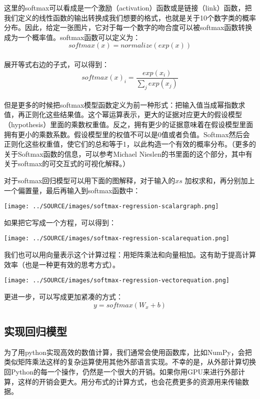 这里的softmax可以看成是一个激励（activation）函数或是链接（link）函数，把我们定义的线性函数的输出转换成我们想要的格式，也就是关于10个数字类的概率分布。因此，给定一张图片，它对于每一个数字的吻合度可以被softmax函数转换成为一个概率值。softmax函数可以定义为：\\
\begin{equation}
softmax(x) = normalize(exp(x))
\end{equation}\\
展开等式右边的子式，可以得到：\\
\begin{equation}
softmax(x)_i = \frac{exp(x_i)}{\sum_j{exp(x_j)}}
\end{equation}\\
但是更多的时候把softmax模型函数定义为前一种形式：把输入值当成幂指数求值，再正则化这些结果值。这个幂运算表示，更大的证据对应更大的假设模型（hypothesis）里面的乘数权重值。反之，拥有更少的证据意味着在假设模型里面拥有更小的乘数系数。假设模型里的权值不可以是0值或者负值。Softmax然后会正则化这些权重值，使它们的总和等于1，以此构造一个有效的概率分布。（更多的关于Softmax函数的信息，可以参考Michael Nieslen的书里面的这个部分，其中有关于softmax的可交互式的可视化解释。）

对于softmax回归模型可以用下面的图解释，对于输入的$xs$ 加权求和，再分别加上一个偏置量，最后再输入到softmax函数中：
\begin{center}
\texttt{[image: ../SOURCE/images/softmax-regression-scalargraph.png]}
\end{center}
如果把它写成一个方程，可以得到：
\begin{center}
\texttt{[image: ../SOURCE/images/softmax-regression-scalarequation.png]}
\end{center}
我们也可以用向量表示这个计算过程：用矩阵乘法和向量相加。这有助于提高计算效率（也是一种更有效的思考方式）。
\begin{center}
\texttt{[image: ../SOURCE/images/softmax-regression-vectorequation.png]}
\end{center}
更进一步，可以写成更加紧凑的方式：
\begin{equation}
y = softmax(W_x+b)
\end{equation}

\subsection {实现回归模型}
为了用python实现高效的数值计算，我们通常会使用函数库，比如NumPy，会把类似矩阵乘法这样的复杂运算使用其他外部语言实现。不幸的是，从外部计算切换回Python的每一个操作，仍然是一个很大的开销。如果你用GPU来进行外部计算，这样的开销会更大。用分布式的计算方式，也会花费更多的资源用来传输数据。

